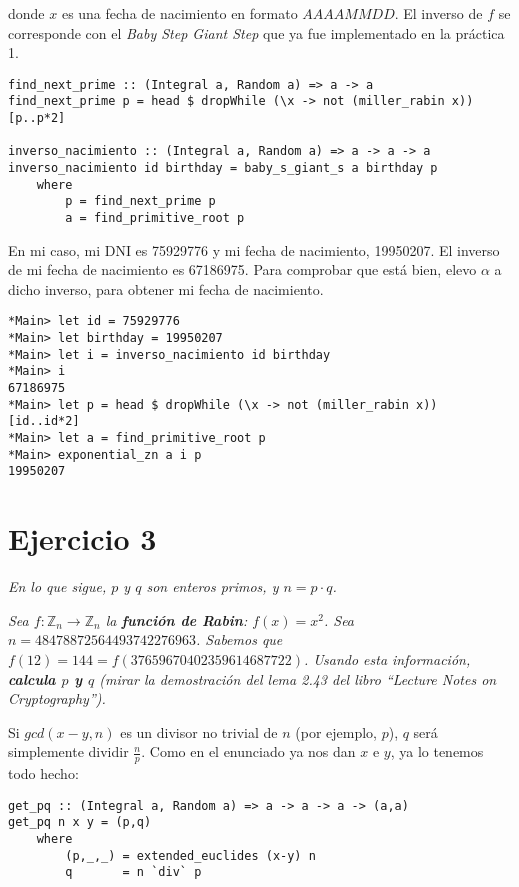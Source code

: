 \documentclass[10pt,spanish]{article}
\begin{document}
donde $x$ es una fecha de nacimiento en formato $AAAAMMDD$. El inverso de $f$ se corresponde con el \textit{\textcolor{azul}{Baby Step Giant Step}} que ya fue implementado en la práctica 1.

\begin{verbatim}
find_next_prime :: (Integral a, Random a) => a -> a
find_next_prime p = head $ dropWhile (\x -> not (miller_rabin x)) [p..p*2]

inverso_nacimiento :: (Integral a, Random a) => a -> a -> a
inverso_nacimiento id birthday = baby_s_giant_s a birthday p
    where
        p = find_next_prime p
        a = find_primitive_root p
\end{verbatim}

En mi caso, mi DNI es 75929776 y mi fecha de nacimiento, 19950207. El inverso de mi fecha de nacimiento es 67186975. Para comprobar que está bien, elevo $\alpha$ a dicho inverso, para obtener mi fecha de nacimiento.

\begin{verbatim}
*Main> let id = 75929776
*Main> let birthday = 19950207
*Main> let i = inverso_nacimiento id birthday
*Main> i
67186975
*Main> let p = head $ dropWhile (\x -> not (miller_rabin x)) [id..id*2]
*Main> let a = find_primitive_root p
*Main> exponential_zn a i p
19950207
\end{verbatim}

\section{\textcolor{azul}Ejercicio 3}
\textit{En lo que sigue, $p$ y $q$ son enteros primos, y $n = p \cdot q$.}

\textit{Sea $f: \mathbb{Z}_n \rightarrow \mathbb{Z}_n$ la \textbf{\textcolor{azul}{función de Rabin}}: $f(x) = x^2$. Sea $n = 48478872564493742276963$. Sabemos que $f(12) = 144= f(37659670402359614687722)$. Usando esta información, \textbf{\textcolor{azul}{calcula $p$ y $q$}} (mirar la demostración del lema 2.43 del libro ``Lecture Notes on Cryptography'').}

Si $gcd(x-y,n)$ es un divisor no trivial de $n$ (por ejemplo, $p$), $q$ será simplemente dividir $\frac{n}{p}$. Como en el enunciado ya nos dan $x$ e $y$, ya lo tenemos todo hecho:

\begin{verbatim}
get_pq :: (Integral a, Random a) => a -> a -> a -> (a,a)
get_pq n x y = (p,q)
    where
        (p,_,_) = extended_euclides (x-y) n
        q       = n `div` p
\end{verbatim}
\end{document}
